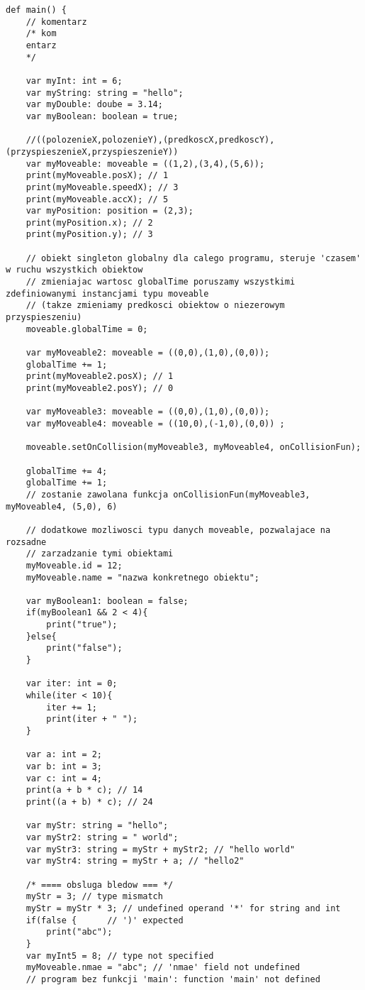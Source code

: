 \documentclass[12pt]{article}
\begin{document}
\begin{lstlisting}[columns=fullflexible,basicstyle=\tiny,tabsize=3,]
def main() {
	// komentarz
	/* kom
	entarz
	*/
	
	var myInt: int = 6;
	var myString: string = "hello";
	var myDouble: doube = 3.14;
	var myBoolean: boolean = true;

	//((polozenieX,polozenieY),(predkoscX,predkoscY),(przyspieszenieX,przyspieszenieY))
	var myMoveable: moveable = ((1,2),(3,4),(5,6)); 
	print(myMoveable.posX); // 1
	print(myMoveable.speedX); // 3
	print(myMoveable.accX); // 5 
	var myPosition: position = (2,3);
	print(myPosition.x); // 2
	print(myPosition.y); // 3

	// obiekt singleton globalny dla calego programu, steruje 'czasem' w ruchu wszystkich obiektow
	// zmieniajac wartosc globalTime poruszamy wszystkimi zdefiniowanymi instancjami typu moveable
    // (takze zmieniamy predkosci obiektow o niezerowym przyspieszeniu)
	moveable.globalTime = 0;

	var myMoveable2: moveable = ((0,0),(1,0),(0,0));
	globalTime += 1;
	print(myMoveable2.posX); // 1
	print(myMoveable2.posY); // 0

	var myMoveable3: moveable = ((0,0),(1,0),(0,0));
	var myMoveable4: moveable = ((10,0),(-1,0),(0,0)) ;

	moveable.setOnCollision(myMoveable3, myMoveable4, onCollisionFun);
	
	globalTime += 4;
	globalTime += 1;
	// zostanie zawolana funkcja onCollisionFun(myMoveable3, myMoveable4, (5,0), 6)

	// dodatkowe mozliwosci typu danych moveable, pozwalajace na rozsadne 
    // zarzadzanie tymi obiektami
	myMoveable.id = 12;
	myMoveable.name = "nazwa konkretnego obiektu";

	var myBoolean1: boolean = false;
	if(myBoolean1 && 2 < 4){
		print("true");
	}else{
		print("false");
	}
	
	var iter: int = 0;
    while(iter < 10){
        iter += 1;
        print(iter + " ");
    }

	var a: int = 2;
	var b: int = 3;
	var c: int = 4;
	print(a + b * c); // 14
	print((a + b) * c); // 24

	var myStr: string = "hello";
	var myStr2: string = " world";
	var myStr3: string = myStr + myStr2; // "hello world"
	var myStr4: string = myStr + a; // "hello2"

	/* ==== obsluga bledow === */
	myStr = 3; // type mismatch
	myStr = myStr * 3; // undefined operand '*' for string and int
	if(false {		// ')' expected
		print("abc");
	}
	var myInt5 = 8; // type not specified
	myMoveable.nmae = "abc"; // 'nmae' field not undefined
	// program bez funkcji 'main': function 'main' not defined


\end{lstlisting}
\end{document}
